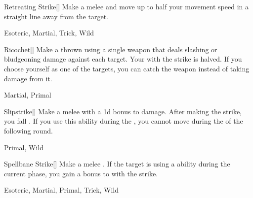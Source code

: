 \lowercase{\hypertarget{maneuver:Retreating Strike}{}}\label{maneuver:Retreating Strike}
\hypertarget{maneuver:Retreating Strike}{}
\begin{freeability}[Rank 2]{Retreating Strike}[]
Make a melee  and move up to half your movement speed in a straight line away from the target.


 Esoteric, Martial, Trick, Wild
\end{freeability}
\vspace{0.25em}



\lowercase{\hypertarget{maneuver:Ricochet}{}}\label{maneuver:Ricochet}
\hypertarget{maneuver:Ricochet}{}
\begin{freeability}[Rank 2]{Ricochet}[]
Make a thrown  using a single weapon that deals slashing or bludgeoning damage against each target.
Your  with the strike is halved.
If you choose yourself as one of the targets, you can catch the weapon instead of taking damage from it.


 Martial, Primal
\end{freeability}
\vspace{0.25em}



\lowercase{\hypertarget{maneuver:Slipstrike}{}}\label{maneuver:Slipstrike}
\hypertarget{maneuver:Slipstrike}{}
\begin{freeability}[Rank 2]{Slipstrike}[]
Make a melee  with a \plus1d bonus to damage.
After making the strike, you fall .
If you use this ability during the , you cannot move during the  of the following round.


 Primal, Wild
\end{freeability}
\vspace{0.25em}



\lowercase{\hypertarget{maneuver:Spellbane Strike}{}}\label{maneuver:Spellbane Strike}
\hypertarget{maneuver:Spellbane Strike}{}
\begin{freeability}[Rank 2]{Spellbane Strike}[]
Make a melee .
If the target is using a  ability during the current phase, you gain a  bonus to  with the strike.


 Esoteric, Martial, Primal, Trick, Wild
\end{freeability}
\vspace{0.25em}



